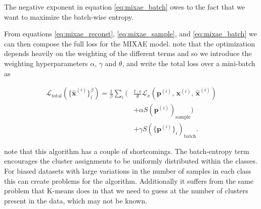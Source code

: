 \noindent The negative exponent in equation \ref{eq:mixae_batch} owes to the fact that we want to maximize the batch-wise entropy.

From equations \ref{eq:mixae_reconst}, \ref{eq:mixae_sample}, and \ref{eq:mixae_batch} we can then compose the full loss for the MIXAE model. \cite{Zhang} note that the optimization depends heavily on the weighting of the different terms and so we introduce the weighting hyperparameters $\alpha$, $\gamma$ and $\theta$, and write the total loss over a mini-batch as 

\begin{equation}
\begin{split}
\mathcal{L}_{\text{total}}(\{\hat{\mathbf{x}}^{(i)}\}^\beta_i) = \frac{1}{\beta}\sum_i \Big( &\frac{t\cdot v}{\theta} \mathcal{L}_x(\mathbf{p}^{(i)},\,\mathbf{x}^{(i)},\, \hat{\mathbf{x}}^{(i)} ) \\
&+ \alpha S(\mathbf{p}^{(i)})_{\text{sample}} \Big) \\
&+\gamma S(\{\mathbf{p}^{(i)}\}_i)_{\text{batch}}.
\end{split}
\end{equation}

\noindent \cite{Zhang} note that this algorithm has a couple of shortcomings. The batch-entropy term encourages the cluster assignments to be uniformly distributed within the classes. For biased datasets with large variations in the number of samples in each class this can create problems for the algorithm. Additionally it suffers from the same problem that K-means does in that we need to guess at the number of clusters present in the data, which may not be known. 